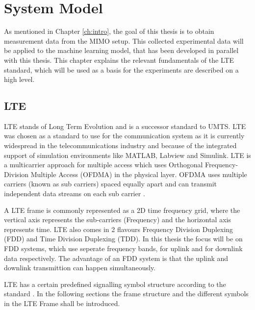 \chapter{System Model}
\label{ch:sysmodel}

As mentioned in Chapter \ref{ch:intro}, the goal of this thesis is to obtain measurement data from the MIMO setup. This collected experimental data will be applied to the machine learning model, that has been developed in parallel with this thesis. This chapter explains the relevant fundamentals of the LTE standard, which will be used as a basis for the experiments are described on a high level.

%

\section{LTE}\label{sec:LTEProc}

LTE stands of Long Term Evolution and is a successor standard to UMTS. LTE was chosen as a standard to use for the communication system as it is currently widespread in the telecommunications industry and because of the integrated support of simulation environments like MATLAB, Labview and Simulink. LTE is a multicarrier approach for multiple access which uses Orthogonal Frequency-Division Multiple Access (OFDMA) in the physical layer. OFDMA uses multiple carriers (known as sub carriers) spaced equally apart and can transmit independent data streams on each sub carrier \cite{rohling}.

A LTE frame is commonly represented as a 2D time frequency grid, where the vertical axis represents the sub-carriers (Frequency) and the horizontal axis represents time. LTE also comes in 2 flavours Frequency Division Duplexing (FDD) and Time Division Duplexing (TDD). In this thesis the focus will be on FDD systems, which use seperate frequency bands, for uplink and for downlink data respectively. The advantage of an FDD system is that the uplink and downlink transmittion can happen simultaneously.

LTE has a certain predefined signalling symbol structure according to the standard \cite{3gpp36211}. In the following sections the frame structure and the different symbols in the LTE Frame shall be introduced.

